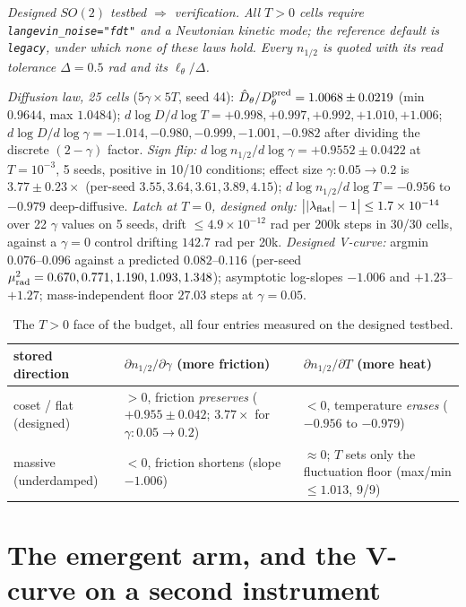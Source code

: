 \documentclass{article}
\begin{document}
\emph{Designed $SO(2)$ testbed $\Rightarrow$ verification. All $T>0$ cells require \texttt{langevin\_noise="fdt"} and a Newtonian kinetic mode; the reference default is \texttt{legacy}, under which none of these laws hold. Every $n_{1/2}$ is quoted with its read tolerance $\Delta=0.5$ rad and its $\ell_\theta/\Delta$.}

\emph{Diffusion law, 25 cells} ($5\gamma\times5T$, seed 44): $\hat D_\theta/D_\theta^{\rm pred}=1.0068\pm0.0219$ (min $0.9644$, max $1.0484$); $d\log D/d\log T=+0.998,+0.997,+0.992,+1.010,+1.006$; $d\log D/d\log\gamma=-1.014,-0.980,-0.999,-1.001,-0.982$ after dividing the discrete $(2-\gamma)$ factor. \emph{Sign flip:} $d\log n_{1/2}/d\log\gamma=+0.9552\pm0.0422$ at $T=10^{-3}$, 5 seeds, positive in 10/10 conditions; effect size $\gamma:0.05\to0.2$ is $3.77\pm0.23\times$ (per-seed $3.55,3.64,3.61,3.89,4.15$); $d\log n_{1/2}/d\log T=-0.956$ to $-0.979$ deep-diffusive. \emph{Latch at $T=0$, designed only:} $\big||\lambda_{\rm flat}|-1\big|\le1.7\times10^{-14}$ over 22 $\gamma$ values on 5 seeds, drift $\le4.9\times10^{-12}$ rad per 200k steps in 30/30 cells, against a $\gamma=0$ control drifting $142.7$ rad per 20k. \emph{Designed V-curve:} argmin $0.076$--$0.096$ against a predicted $0.082$--$0.116$ (per-seed $\mu^2_{\rm rad}=0.670,0.771,1.190,1.093,1.348$); asymptotic log-slopes $-1.006$ and $+1.23$--$+1.27$; mass-independent floor $27.03$ steps at $\gamma=0.05$.

\begin{table}[!htb]\centering\scriptsize
\caption{The $T>0$ face of the budget, all four entries measured on the designed testbed.}
\begin{tabular}{lll}
\toprule
stored direction & $\partial n_{1/2}/\partial\gamma$ (more friction) & $\partial n_{1/2}/\partial T$ (more heat)\\
\midrule
coset / flat (designed) & $>0$, friction \emph{preserves} ($+0.955\pm0.042$; $3.77\times$ for $\gamma:0.05\to0.2$) & $<0$, temperature \emph{erases} ($-0.956$ to $-0.979$)\\
massive (underdamped) & $<0$, friction shortens (slope $-1.006$) & $\approx0$; $T$ sets only the fluctuation floor (max/min $\le1.013$, 9/9)\\
\bottomrule
\end{tabular}
\end{table}

\section{The emergent arm, and the V-curve on a second instrument}\label{app:emergent}
\end{document}
